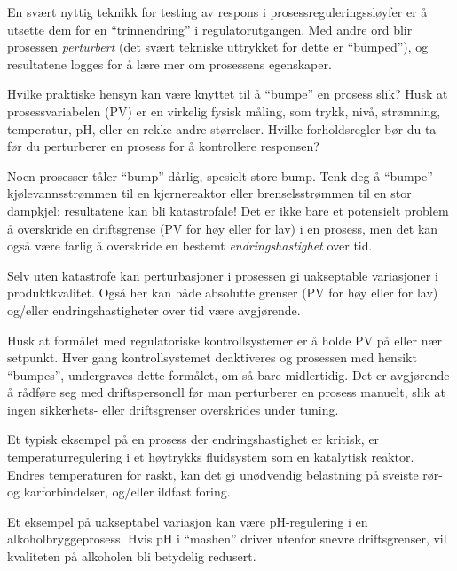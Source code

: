 
En svært nyttig teknikk for testing av respons i prosessreguleringssløyfer er å utsette dem for en ``trinnendring'' i regulatorutgangen. Med andre ord blir prosessen {\it perturbert} (det svært tekniske uttrykket for dette er ``bumped''), og resultatene logges for å lære mer om prosessens egenskaper.

Hvilke praktiske hensyn kan være knyttet til å ``bumpe'' en prosess slik? Husk at prosessvariabelen (PV) er en virkelig fysisk måling, som trykk, nivå, strømning, temperatur, pH, eller en rekke andre størrelser. Hvilke forholdsregler bør du ta før du perturberer en prosess for å kontrollere responsen?







Noen prosesser tåler ``bump'' dårlig, spesielt store bump. Tenk deg å ``bumpe'' kjølevannsstrømmen til en kjernereaktor eller brenselsstrømmen til en stor dampkjel: resultatene kan bli katastrofale! Det er ikke bare et potensielt problem å overskride en driftsgrense (PV for høy eller for lav) i en prosess, men det kan også være farlig å overskride en bestemt {\it endringshastighet} over tid.

Selv uten katastrofe kan perturbasjoner i prosessen gi uakseptable variasjoner i produktkvalitet. Også her kan både absolutte grenser (PV for høy eller for lav) og/eller endringshastigheter over tid være avgjørende.

Husk at formålet med regulatoriske kontrollsystemer er å holde PV på eller nær setpunkt. Hver gang kontrollsystemet deaktiveres og prosessen med hensikt ``bumpes'', undergraves dette formålet, om så bare midlertidig. Det er avgjørende å rådføre seg med driftspersonell før man perturberer en prosess manuelt, slik at ingen sikkerhets- eller driftsgrenser overskrides under tuning.







Et typisk eksempel på en prosess der endringshastighet er kritisk, er temperaturregulering i et høytrykks fluidsystem som en katalytisk reaktor. Endres temperaturen for raskt, kan det gi unødvendig belastning på sveiste rør- og karforbindelser, og/eller ildfast foring.

Et eksempel på uakseptabel variasjon kan være pH-regulering i en alkoholbryggeprosess. Hvis pH i ``mashen'' driver utenfor snevre driftsgrenser, vil kvaliteten på alkoholen bli betydelig redusert.


